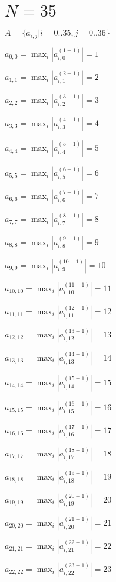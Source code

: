 \documentclass[a4paper,12pt]{article}
\begin{document}
\section{ $N = 35$ }
$A = \{ a _{ i, j } | i = \bar { 0..35 }, j = \bar { 0..36 } \}$

$a _{ 0, 0 } =  \max _i |a _{ i, 0 } ^{ (1 - 1) } | = 1$

$a _{ 1, 1 } =  \max _i |a _{ i, 1 } ^{ (2 - 1) } | = 2$

$a _{ 2, 2 } =  \max _i |a _{ i, 2 } ^{ (3 - 1) } | = 3$

$a _{ 3, 3 } =  \max _i |a _{ i, 3 } ^{ (4 - 1) } | = 4$

$a _{ 4, 4 } =  \max _i |a _{ i, 4 } ^{ (5 - 1) } | = 5$

$a _{ 5, 5 } =  \max _i |a _{ i, 5 } ^{ (6 - 1) } | = 6$

$a _{ 6, 6 } =  \max _i |a _{ i, 6 } ^{ (7 - 1) } | = 7$

$a _{ 7, 7 } =  \max _i |a _{ i, 7 } ^{ (8 - 1) } | = 8$

$a _{ 8, 8 } =  \max _i |a _{ i, 8 } ^{ (9 - 1) } | = 9$

$a _{ 9, 9 } =  \max _i |a _{ i, 9 } ^{ (10 - 1) } | = 10$

$a _{ 10, 10 } =  \max _i |a _{ i, 10 } ^{ (11 - 1) } | = 11$

$a _{ 11, 11 } =  \max _i |a _{ i, 11 } ^{ (12 - 1) } | = 12$

$a _{ 12, 12 } =  \max _i |a _{ i, 12 } ^{ (13 - 1) } | = 13$

$a _{ 13, 13 } =  \max _i |a _{ i, 13 } ^{ (14 - 1) } | = 14$

$a _{ 14, 14 } =  \max _i |a _{ i, 14 } ^{ (15 - 1) } | = 15$

$a _{ 15, 15 } =  \max _i |a _{ i, 15 } ^{ (16 - 1) } | = 16$

$a _{ 16, 16 } =  \max _i |a _{ i, 16 } ^{ (17 - 1) } | = 17$

$a _{ 17, 17 } =  \max _i |a _{ i, 17 } ^{ (18 - 1) } | = 18$

$a _{ 18, 18 } =  \max _i |a _{ i, 18 } ^{ (19 - 1) } | = 19$

$a _{ 19, 19 } =  \max _i |a _{ i, 19 } ^{ (20 - 1) } | = 20$

$a _{ 20, 20 } =  \max _i |a _{ i, 20 } ^{ (21 - 1) } | = 21$

$a _{ 21, 21 } =  \max _i |a _{ i, 21 } ^{ (22 - 1) } | = 22$

$a _{ 22, 22 } =  \max _i |a _{ i, 22 } ^{ (23 - 1) } | = 23$
\end{document}
